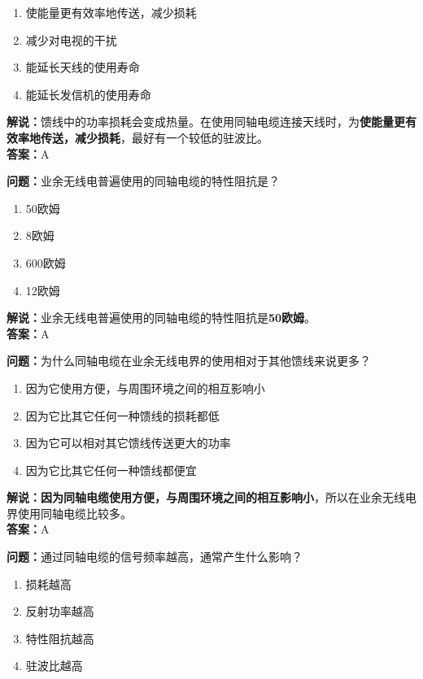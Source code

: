 \begin{enumerate}[label=\Alph*), leftmargin=1cm]
	\item 使能量更有效率地传送，减少损耗
	\item 减少对电视的干扰
	\item 能延长天线的使用寿命
	\item 能延长发信机的使用寿命
\end{enumerate}

\textbf{解说：}馈线中的功率损耗会变成热量。在使用同轴电缆连接天线时，为\textbf{使能量更有效率地传送，减少损耗}，最好有一个较低的驻波比。\\\textbf{答案：}A%



\textbf{问题：}业余无线电普遍使用的同轴电缆的特性阻抗是？

\begin{enumerate}[label=\Alph*), leftmargin=1cm]
	\item 50欧姆
	\item 8欧姆
	\item 600欧姆
	\item 12欧姆
\end{enumerate}

\textbf{解说：}业余无线电普遍使用的同轴电缆的特性阻抗是\textbf{50欧姆}。\\\textbf{答案：}A%



\textbf{问题：}为什么同轴电缆在业余无线电界的使用相对于其他馈线来说更多？

\begin{enumerate}[label=\Alph*), leftmargin=1cm]
	\item 因为它使用方便，与周围环境之间的相互影响小
	\item 因为它比其它任何一种馈线的损耗都低
	\item 因为它可以相对其它馈线传送更大的功率
	\item 因为它比其它任何一种馈线都便宜
\end{enumerate}

\textbf{解说：}\textbf{因为同轴电缆使用方便，与周围环境之间的相互影响小}，所以在业余无线电界使用同轴电缆比较多。\\\textbf{答案：}A%



\textbf{问题：}通过同轴电缆的信号频率越高，通常产生什么影响？

\begin{enumerate}[label=\Alph*), leftmargin=1cm]
	\item 损耗越高
	\item 反射功率越高
	\item 特性阻抗越高
	\item 驻波比越高
\end{enumerate}

